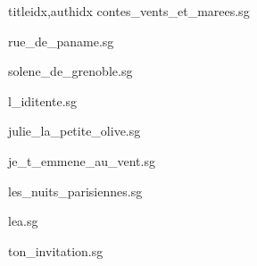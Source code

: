 \documentclass[
    fontsize=7pt
    ]{scrartcl}
\begin{document}
\begin{songs}{titleidx,authidx}
{contes_vents_et_marees.sg}


{rue_de_paname.sg}


{solene_de_grenoble.sg}


{l_iditente.sg}


{julie_la_petite_olive.sg}


{je_t_emmene_au_vent.sg}


{les_nuits_parisiennes.sg}


{lea.sg}


{ton_invitation.sg}



\end{songs}
\end{document}
